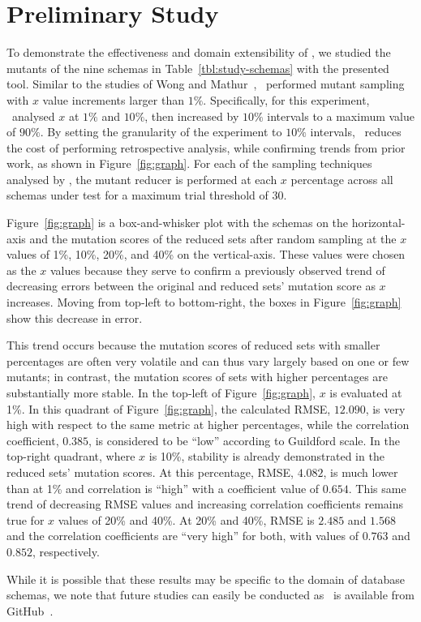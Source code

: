 \vspace*{-.25em}

\section{Preliminary Study}


To demonstrate the effectiveness and domain extensibility of \mrstudyr, we studied the mutants of the nine schemas in
Table~\ref{tbl:study-schemas} with the presented tool. Similar to the studies of Wong and Mathur~\cite{mathur1994empirical},
\mr~performed mutant sampling with $x$ value increments larger than $1\%$. Specifically, for this experiment, \mr~analysed
$x$ at $1\%$ and $10\%$, then increased by $10\%$ intervals to a maximum value of $90\%$. By setting the granularity of the
experiment to $10\%$ intervals, \mr~reduces the cost of performing retrospective analysis, while confirming trends from prior
work, as shown in Figure~\ref{fig:graph}. For each of the sampling techniques analysed by \mr, the mutant reducer is performed
at each $x$ percentage across all schemas under test for a maximum trial threshold of 30.


Figure~\ref{fig:graph} is a box-and-whisker plot with the schemas on the horizontal-axis and the mutation scores of the reduced
sets after random sampling at the $x$ values of 1\%, 10\%, 20\%, and 40\% on the vertical-axis.  These values were chosen as the
$x$ values because they serve to confirm a previously observed trend of decreasing errors between the original and reduced sets'
mutation score as $x$ increases. Moving from top-left to bottom-right, the boxes in Figure~\ref{fig:graph} show this decrease in
error.


This trend occurs because the mutation scores of reduced sets with smaller percentages are often very volatile and can
thus vary largely based on one or few mutants; in contrast, the mutation scores of sets with higher percentages are substantially
more stable. In the top-left of Figure~\ref{fig:graph}, $x$ is evaluated at 1\%. In this quadrant of Figure~\ref{fig:graph}, the
calculated RMSE, $12.090$, is very high with respect to the same metric at higher percentages, while the correlation coefficient,
$0.385$, is considered to be ``low'' according to Guildford scale. In the top-right quadrant, where
$x$ is 10\%, stability is already demonstrated in the reduced sets' mutation scores. At this percentage, RMSE, $4.082$, is much lower
than at 1\% and correlation is ``high'' with a coefficient value of $0.654$. This same trend of decreasing RMSE values and increasing
correlation coefficients remains true for $x$ values of 20\% and 40\%. At 20\% and 40\%, RMSE is $2.485$ and $1.568$ and the correlation
coefficients are ``very high'' for both, with values of $0.763$ and $0.852$, respectively. 

While it is possible that these results may be specific to the domain of database schemas, we note that future studies can easily
be conducted as \mr~is available from GitHub~\cite{tool}.


